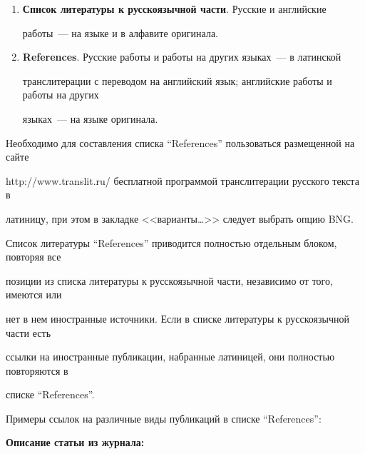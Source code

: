 {{\begin{enumerate}[1.]
\begin{enumerate}[(1)]


\item \textbf{Список литературы к русскоязычной части}. Русские и английские


работы~---  на языке и в алфавите оригинала.


\item  \textbf{References}. Русские работы и работы на других языках~--- в латинской


транслитерации с переводом на английский язык; английские работы и работы на других


языках~--- на языке оригинала.\\[-13.5pt]


\end{enumerate}





Необходимо для составления списка ``References'' пользоваться размещенной на сайте


{\sf http://www.translit.ru/} бесплатной программой транслитерации русского текста в


латиницу, при этом в закладке <<варианты\ldots>> следует выбрать опцию BNG.





Список литературы ``References'' приводится полностью отдельным блоком, повторяя все


позиции из списка литературы к русскоязычной части, независимо от того, имеются или


нет в нем иностранные источники. Если в списке литературы к русскоязычной части есть


ссылки на иностранные публикации, набранные латиницей, они полностью повторяются в


списке ``References''.





Примеры ссылок на различные виды публикаций в списке ``References'':





\thispagestyle{empty}





{\small





\noindent


\textbf{Описание статьи из журнала:}








}
\end{enumerate}}}
